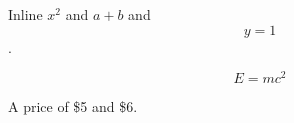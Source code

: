 Inline \(x^2\) and \(a+b\) and $$y=1$$.

\begin{equation}
E = mc^2
\end{equation}

A price of \$5 and \$6.
